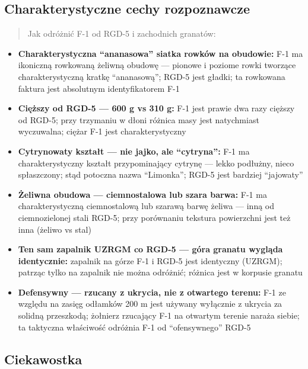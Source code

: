 \documentclass[12pt,oneside]{book}
\providecommand{\tightlist}{%
  \setlength{\itemsep}{0pt}\setlength{\parskip}{0pt}}
\begin{document}
\subsection{Charakterystyczne cechy
rozpoznawcze}\label{charakterystyczne-cechy-rozpoznawcze-116}

\begin{quote}
Jak odróżnić F-1 od RGD-5 i zachodnich granatów:
\end{quote}

\begin{itemize}
\tightlist
\item
  \textbf{Charakterystyczna ``ananasowa'' siatka rowków na obudowie:}
  F-1 ma ikoniczną rowkowaną żeliwną obudowę --- pionowe i poziome rowki
  tworzące charakterystyczną kratkę ``ananasową''; RGD-5 jest gładki; ta
  rowkowana faktura jest absolutnym identyfikatorem F-1
\item
  \textbf{Cięższy od RGD-5 --- 600 g vs 310 g:} F-1 jest prawie dwa razy
  cięższy od RGD-5; przy trzymaniu w dłoni różnica masy jest natychmiast
  wyczuwalna; ciężar F-1 jest charakterystyczny
\item
  \textbf{Cytrynowaty kształt --- nie jajko, ale ``cytryna'':} F-1 ma
  charakterystyczny kształt przypominający cytrynę --- lekko podłużny,
  nieco spłaszczony; stąd potoczna nazwa ``Limonka''; RGD-5 jest
  bardziej ``jajowaty''
\item
  \textbf{Żeliwna obudowa --- ciemnostalowa lub szara barwa:} F-1 ma
  charakterystyczną ciemnostalową lub szarawą barwę żeliwa --- inną od
  ciemnozielonej stali RGD-5; przy porównaniu tekstura powierzchni jest
  też inna (żeliwo vs stal)
\item
  \textbf{Ten sam zapalnik UZRGM co RGD-5 --- góra granatu wygląda
  identycznie:} zapalnik na górze F-1 i RGD-5 jest identyczny (UZRGM);
  patrząc tylko na zapalnik nie można odróżnić; różnica jest w korpusie
  granatu
\item
  \textbf{Defensywny --- rzucany z ukrycia, nie z otwartego terenu:} F-1
  ze względu na zasięg odłamków 200 m jest używany wyłącznie z ukrycia
  za solidną przeszkodą; żołnierz rzucający F-1 na otwartym terenie
  naraża siebie; ta taktyczna właściwość odróżnia F-1 od ``ofensywnego''
  RGD-5
\end{itemize}

\subsection{Ciekawostka}\label{ciekawostka-116}
\end{document}

